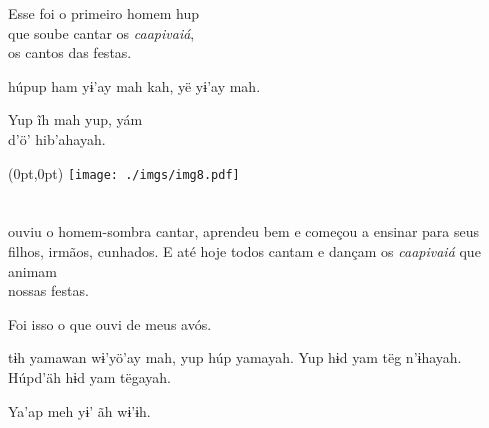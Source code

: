 Esse foi o primeiro homem hup\\
que soube cantar os \textit{caapivaiá},\\
os cantos das festas.

\vspace{2em}

 húpup ham
yɨ’ay mah kah, yë
yɨ’ay mah.

\medskip

Yup ĩh mah yup, yám\\
d’ö’ hib’ahayah.

\vspace*{\fill}

\pagebreak

\begin{textblock*}{8in}(0pt,0pt)%
\vspace*{-2.8cm}
\hspace*{-3.2cm}\texttt{[image: ./imgs/img8.pdf]}
\end{textblock*}

\chapter*{}

\mbox{}\vspace*{\fill}

 ouviu o homem-sombra cantar,
aprendeu bem e
começou a ensinar
para seus filhos,
irmãos, cunhados.
E até hoje todos
cantam e dançam os
\textit{caapivaiá} que animam\\
nossas festas.

\medskip

Foi isso o que ouvi de
meus avós.

\vspace{2em}

 tɨh yamawan
wɨ’yö’ay mah, yup húp
yamayah. Yup hɨd yam
tëg n’ɨhayah. Húpd’äh
hɨd yam tëgayah.

\medskip

Ya’ap meh yɨ’ ãh wɨ’ɨh.

\vspace*{\fill}

\pagebreak

